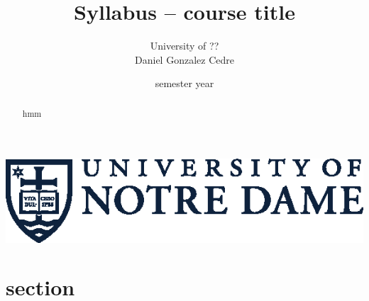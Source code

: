 




\title{Syllabus -- course title}
\author[Daniel Gonzalez Cedre]{University of ?? \\[1ex] Daniel Gonzalez Cedre}
\date{semester year}



\maketitle

\begin{marginfigure}[-39ex]
    \includegraphics[width=\textwidth]{figures/nd-academic-mark.eps}
\end{marginfigure}

\begin{abstract}
    hmm
\end{abstract}

\tableofcontents
\newpage

\section{section}


